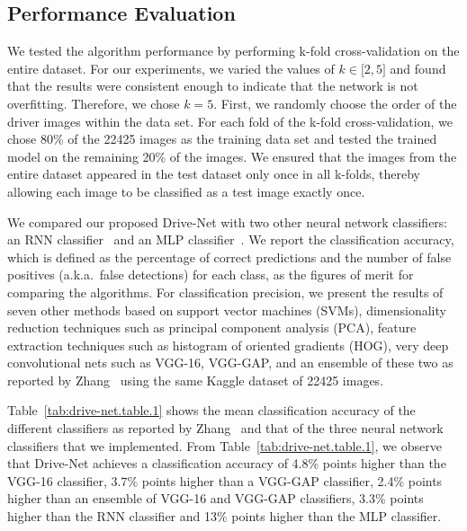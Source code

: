 \documentclass[conference,compsoc]{IEEEtran}
\begin{document}
\subsection{Performance Evaluation} We tested the algorithm performance by performing k-fold cross-validation on the entire dataset. For our experiments, we varied the values of $k\in\lbrack2, 5 \rbrack $ and found that the results were consistent enough to indicate that the network is not overfitting. Therefore, we chose $k = 5 $. First, we randomly choose the order of the driver images within the data set. For each fold of the k-fold cross-validation, we chose 80\% of the 22425 images as the training data set and tested the trained model on the remaining 20\% of the images. We ensured that the images from the entire dataset appeared in the test dataset only once in all k-folds, thereby allowing each image to be classified as a test image exactly once.

We compared our proposed Drive-Net with two other neural network classifiers: an RNN classifier~\cite{liang_Recurrent_2015} and an MLP classifier~\cite{haykin_Neural_2009}. We report the classification accuracy, which is defined as the percentage of correct predictions and the number of false positives (a.k.a.\ false detections) for each class, as the figures of merit for comparing the algorithms. For classification precision, we present the results of seven other methods based on support vector machines (SVMs), dimensionality reduction techniques such as principal component analysis (PCA), feature extraction techniques such as histogram of oriented gradients (HOG), very deep convolutional nets such as VGG-16, VGG-GAP, and an ensemble of these two as reported by Zhang~\cite{zhang_Apply_2016} using the same Kaggle dataset of 22425 images.

Table~\ref{tab:drive-net.table.1} shows the mean classification accuracy of the different classifiers as reported by Zhang~\cite{zhang_Apply_2016} and that of the three neural network classifiers that we implemented. From Table~\ref{tab:drive-net.table.1}, we observe that Drive-Net achieves a classification accuracy of 4.8\% points higher than the VGG-16 classifier, $3.7\% $ points higher than a VGG-GAP classifier, 2.4\% points higher than an ensemble of VGG-16 and VGG-GAP classifiers, 3.3\% points higher than the RNN classifier and 13\% points higher than the MLP classifier.
\end{document}
